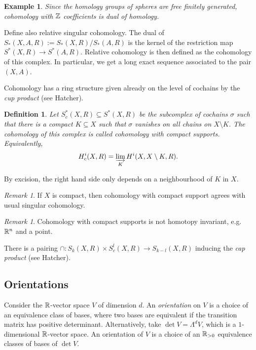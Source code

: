\documentclass[A4paper, british, reqno]{amsart}
\theoremstyle{darkgreentheorem}
\theoremstyle{darkbluedefinition}
\newtheorem{defn}[thm]{Definition}
\theoremstyle{darkredexample}
\newtheorem{exa}[thm]{Example}
\theoremstyle{remark}
\newtheorem{rem}[thm]{Remark}
\newcommand{\1}{\mathbbm{1}}
\newcommand{\tms}{\times}
\newcommand{\sub}{\subseteq}
\begin{document}
\begin{exa}
    Since the homology groups of spheres are free finitely generated, cohomology with $\mathbb{Z}$ coefficients is dual of homology.
\end{exa}

Define also relative singular cohomology.
The dual of $S_{*}(X,A,R):=S_{*}(X,R)/S_{*}(A,R)$ is the kernel of the restriction map $S^{*}(X,R)\to S^{*}(A,R)$.
Relative cohomology is then defined as the cohomology of this complex.
In particular, we get a long exact sequence associated to the pair $(X,A)$.

Cohomology has a ring structure given already on the level of cochains by the \textit{cup product} (see Hatcher).

\begin{defn}
    Let $S_{c}^{*}(X,R)\sub S^{*}(X,R)$ be the subcomplex of cochains $\sigma$ such that there is a compact $K\sub X$ such that $\sigma$ vanishes on all chains on $X\setminus K$.
    The cohomology of this complex is called \textit{cohomology with compact supports}.
    Equivalently,
    \[ H^{i}_{c}(X,R)=\varinjlim_{K}H^{i}(X,X\setminus K,R). \]
\end{defn}

By excision, the right hand side only depends on a neighbourhood of $K$ in $X$.

\begin{rem}
    If $X$ is compact, then cohomology with compact support agrees with usual singular cohomology.
\end{rem}

\begin{rem}
    Cohomology with compact supports is not homotopy invariant, e.g. $\mathbb{R}^{n}$ and a point.
\end{rem}

There is a pairing $\cap \colon S_{k}(X,R)\tms S_{c}^{l}(X,R)\to S_{k-l}(X,R)$ inducing the \textit{cap product} (see Hatcher).

\subsection{Orientations}

Consider the $\mathbb{R}$-vector space $V$ of dimension $d$.
An \textit{orientation} on $V$ is a choice of an equivalence class of bases, where two bases are equivalent if the transition matrix has positive determinant.
Alternatively, take $\det{V}=\Lambda^{d}V$, which is a $1$-dimensional $\mathbb{R}$-vector space.
An orientation of $V$ is a choice of an $\mathbb{R}_{>0}$ equivalence classes of bases of $\det{V}$.
\end{document}
